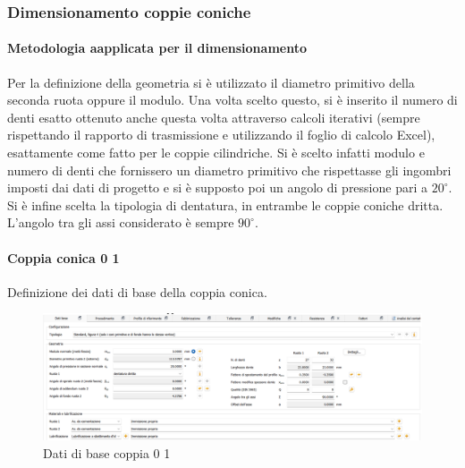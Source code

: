 \subsubsection{Dimensionamento coppie coniche}
\paragraph{Metodologia aapplicata per il dimensionamento}
Per la definizione della geometria si è utilizzato il diametro primitivo della seconda ruota oppure il modulo. Una volta scelto questo, si è inserito il numero di denti esatto ottenuto anche questa volta attraverso calcoli iterativi (sempre rispettando il rapporto di trasmissione e utilizzando il foglio di calcolo Excel), esattamente come fatto per le coppie cilindriche. 
Si è scelto infatti modulo e numero di denti che fornissero un diametro primitivo che rispettasse gli ingombri imposti dai dati di progetto e si è supposto poi un angolo di pressione pari a $20^\circ$. Si è infine scelta la tipologia di dentatura, in entrambe le coppie coniche dritta. L’angolo tra gli assi considerato è sempre $90^\circ$. 
\newpage
\paragraph{Coppia conica 0 1}Definizione dei dati di base della coppia conica.  
\begin{figure}[h]
    \centering
    \includegraphics[scale=0.47]{Immagini/Coppia01.png}
    \caption{Dati di base coppia 0 1}
    \label{fig:Coppia01}
\end{figure}

